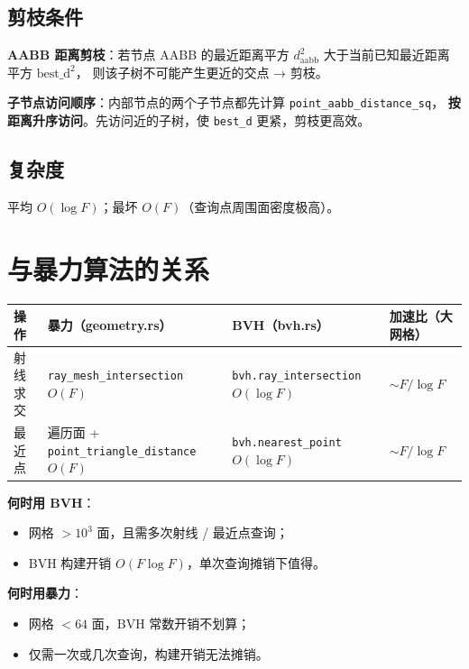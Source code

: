 \documentclass[11pt,a4paper]{article}
\begin{document}
\subsection{剪枝条件}

\textbf{AABB 距离剪枝}：若节点 AABB 的最近距离平方
$d^2_{\text{aabb}}$ 大于当前已知最近距离平方 $\text{best\_d}^2$，
则该子树不可能产生更近的交点 → 剪枝。

\textbf{子节点访问顺序}：内部节点的两个子节点都先计算 \texttt{point\_aabb\_distance\_sq}，
\textbf{按距离升序访问}。先访问近的子树，使 \texttt{best\_d} 更紧，剪枝更高效。

\subsection{复杂度}

平均 $O(\log F)$；最坏 $O(F)$（查询点周围面密度极高）。

\section{与暴力算法的关系}

\begin{center}
\renewcommand{\arraystretch}{1.18}
\begin{tabular}{@{}llll@{}}
  \toprule
  \textbf{操作} & \textbf{暴力（geometry.rs）} & \textbf{BVH（bvh.rs）} & \textbf{加速比（大网格）} \\
  \midrule
  射线求交   & \texttt{ray\_mesh\_intersection} $O(F)$ & \texttt{bvh.ray\_intersection} $O(\log F)$ & $\sim F / \log F$ \\
  最近点     & 遍历面 + \texttt{point\_triangle\_distance} $O(F)$ & \texttt{bvh.nearest\_point} $O(\log F)$ & $\sim F / \log F$ \\
  \bottomrule
\end{tabular}
\end{center}

\textbf{何时用 BVH}：
\begin{itemize}
  \item 网格 $> 10^3$ 面，且需多次射线 / 最近点查询；
  \item BVH 构建开销 $O(F \log F)$，单次查询摊销下值得。
\end{itemize}

\textbf{何时用暴力}：
\begin{itemize}
  \item 网格 $< 64$ 面，BVH 常数开销不划算；
  \item 仅需一次或几次查询，构建开销无法摊销。
\end{itemize}
\end{document}
